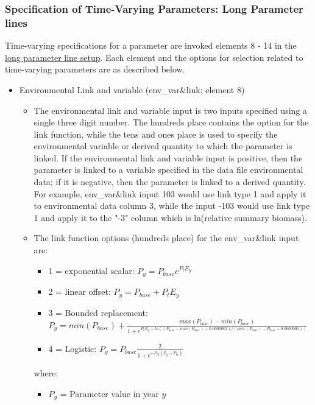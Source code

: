 \subsubsection{Specification of Time-Varying Parameters: Long Parameter lines} 

Time-varying specifications for a parameter are invoked elements 8 - 14 in the \hyperlink{paraOrder}{long parameter line setup}. Each element and the options for selection related to time-varying parameters are as described below.

\hypertarget{EnvVar}{}
\begin{itemize}

\item Environmental Link and variable (env\_var\&link; element 8)

	\begin{itemize}
	   \item The environmental link and variable input is two inputs specified using a single three digit number. The hundreds place contains the option for the link function, while the tens and ones place is used to specify the environmental variable or derived quantity to which the parameter is linked. If the environmental link and variable input is positive, then the parameter is linked to a variable specified in the data file environmental data; if it is negative, then the parameter is linked to a derived quantity. For example, env\_var\&link input 103 would use link type 1 and apply it to environmental data column 3, while the input -103  would use link type 1 and apply it to the "-3" column which is ln(relative summary biomass).
	   \item The link function options (hundreds place) for the env\_var\&link input are:
	   \begin{itemize}
	       \item 1 = exponential scalar: $P_{y} = P_{base}e^{P_{t}E_{y}}$
		   \item 2 = linear offset: $P_{y} = P_{base} + P_{t}E_{y}$
		   \item 3 = Bounded replacement: $P_{y} = min(P_{base})+\frac{max(P_{base})-min(P_{base})}{1+e^{P_tE_y+ln((P_{base}-min(P_{base})+0.0000001)/(max(P_{base})-P_{base}+0.0000001))}}$
		   \item 4 = Logistic: $P_{y} = P_{base}\frac{2}{1+e^{-P_{t2}(E_{y}-P_{t1})}}$
	   \end{itemize}
		where:
	   \begin{itemize}
	       \item $P_{y}$ = Parameter value in year $y$

\end{itemize}
\end{itemize}
\end{itemize}
